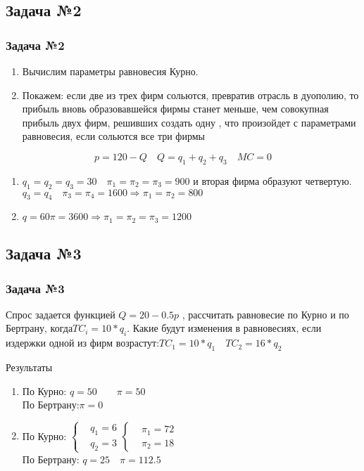 \documentclass {beamer}
\begin{document}
\begin{frame}
\section{Задача №2}
\frametitle{Задача №2}
\begin{enumerate}
\item Вычислим параметры равновесия Курно. 
\item Покажем: если две из трех фирм сольются, превратив отрасль в дуополию, то прибыль вновь образовавшейся фирмы станет меньше, чем совокупная прибыль двух фирм, решивших создать одну
, что произойдет с параметрами равновесия, если сольются все три фирмы 
\end{enumerate}
\begin{block}
{$$p=120-Q \quad Q=q_1+q_2+q_3 \quad MC=0$$}
\begin{enumerate}
\item$q_1=q_2=q_3=30\quad\pi_1=\pi_2=\pi_3=900$
 и вторая фирма образуют четвертую. \\$q_3=q_4\quad \pi_3=\pi_4=1600 \Longrightarrow \pi_1 =\pi_2=800$
\item  $q=60 \pi=3600 \Longrightarrow \pi_1=\pi_2=\pi_3=1200$
\end{enumerate}
\end{block}
\end{frame}

\begin{frame}
\section{Задача №3}
\frametitle{Задача №3}
Спрос задается функцией $Q =20-0.5p $ , рассчитать равновесие по Курно и по Бертрану, когда$TC_i=10*q_i$. Какие будут изменения в равновесиях, если издержки одной из фирм возрастут:$TC_1=10*q_1\quad TC_2=16*q_2$
\begin{block}
{Результаты}
\begin{enumerate}
\item По Курно: $q=50\qquad \pi=50$\\ По Бертрану:\qquad $\pi=0$
\item По Курно: $\left\{ \begin{aligned} &q_1=6\\&q_2=3\end{aligned} \right. \left\{ \begin{aligned} &\pi_1=72 \\&\pi_2=18\end{aligned} \right.$\\ По Бертрану: $q=25 \quad\pi=112.5$  
\end{enumerate}
\end{block}
\end{frame}
\end{document}
